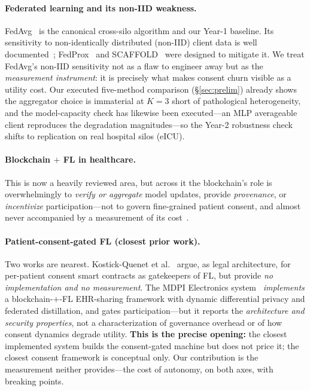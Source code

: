 \documentclass[11pt]{article}
\begin{document}
\paragraph{Federated learning and its non-IID weakness.}
FedAvg~\cite{fedavg} is the canonical cross-silo algorithm and our Year-1
baseline. Its sensitivity to non-identically distributed (non-IID) client data is
well documented~\cite{zhao}; FedProx~\cite{fedprox} and
SCAFFOLD~\cite{scaffold} were designed to mitigate it. We treat FedAvg's non-IID
sensitivity not as a flaw to engineer away but as the \emph{measurement
instrument}: it is precisely what makes consent churn visible as a utility cost.
Our executed five-method comparison (\S\ref{sec:prelim}) already shows the
aggregator choice is immaterial at $K{=}3$ short of pathological heterogeneity,
and the model-capacity check has likewise been executed---an MLP averageable
client reproduces the degradation magnitudes---so the Year-2 robustness check
shifts to replication on real hospital silos (eICU).

\paragraph{Blockchain $+$ FL in healthcare.}
This is now a heavily reviewed area, but across it the blockchain's role is
overwhelmingly to \emph{verify or aggregate} model updates, provide
\emph{provenance}, or \emph{incentivize} participation---not to govern
fine-grained patient consent, and almost never accompanied by a measurement of
its cost~\cite{sheller}.

\paragraph{Patient-consent-gated FL (closest prior work).}
Two works are nearest. Kostick-Quenet et al.~\cite{oxford2025} argue, as legal
architecture, for per-patient consent smart contracts as gatekeepers of FL, but
provide \emph{no implementation and no measurement}. The MDPI Electronics
system~\cite{mdpi2025} \emph{implements} a blockchain-$+$-FL EHR-sharing
framework with dynamic differential privacy and federated distillation, and gates
participation---but it reports the \emph{architecture and security properties},
not a characterization of governance overhead or of how consent dynamics degrade
utility. \textbf{This is the precise opening:} the closest implemented system
builds the consent-gated machine but does not price it; the closest consent
framework is conceptual only. Our contribution is the measurement neither
provides---the cost of autonomy, on both axes, with breaking points.
\end{document}
